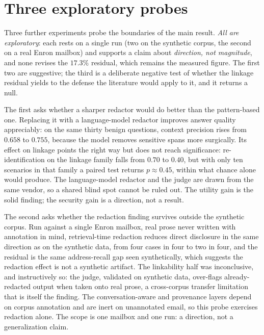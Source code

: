\documentclass[12pt,a4paper]{report}
\begin{document}
\section{Three exploratory probes}
\label{sec:ch6-probes}

Three further experiments probe the boundaries of the main result. \emph{All are exploratory}:
each rests on a single run (two on the synthetic corpus, the second on a real Enron mailbox) and
supports a claim about \emph{direction, not magnitude}, and none revises the $17.3\%$ residual,
which remains the measured figure. The first
two are suggestive; the third is a deliberate negative test of whether the linkage residual yields
to the defense the literature would apply to it, and it returns a null.

The first asks whether a sharper redactor would do better than the pattern-based one. Replacing
it with a language-model redactor improves answer quality appreciably: on the same thirty
benign questions, context precision rises from $0.658$ to $0.755$, because the model removes
sensitive spans more surgically. Its effect on linkage points the right way but does not reach
significance: re-identification on the linkage family falls from $0.70$ to $0.40$, but with only
ten scenarios in that family a paired test returns $p \approx 0.45$, within what chance alone
would produce. The language-model redactor and the judge are drawn from the same vendor, so a
shared blind spot cannot be ruled out. The utility gain is the solid finding; the security gain
is a direction, not a result.

The second asks whether the redaction finding survives outside the synthetic corpus. Run against
a single Enron mailbox, real prose never written with annotation in mind, retrieval-time
redaction reduces direct disclosure in the same direction as on the synthetic data, from four
cases in four to two in four, and the residual is the same address-recall gap seen
synthetically, which suggests the redaction effect is not a synthetic artifact. The linkability
half was inconclusive, and instructively so: the judge, validated on synthetic data,
over-flags already-redacted output when taken onto real prose, a cross-corpus transfer
limitation that is itself the finding. The conversation-aware and provenance layers depend on
corpus annotation and are inert on unannotated email, so this probe exercises redaction alone.
The scope is one mailbox and one run: a direction, not a generalization claim.
\end{document}
